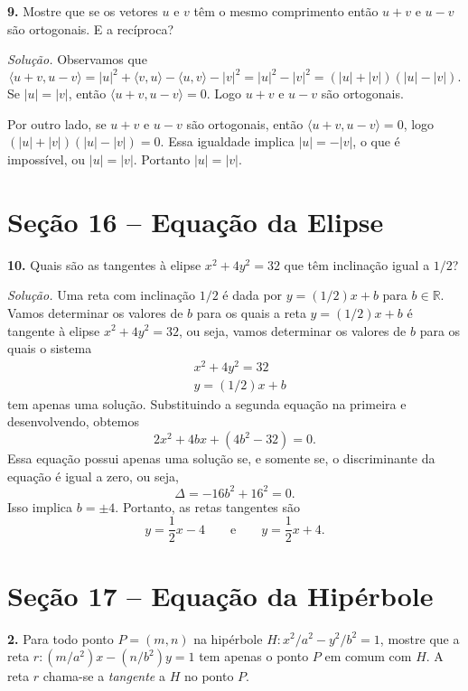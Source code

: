 \documentclass[a4paper,11pt]{article}
\newcommand{\R}{\mathbb{R}}
\begin{document}
\vspace{\baselineskip}

\textbf{9.}
Mostre que se os vetores $u$ e $v$ têm o mesmo comprimento então $u + v$ e $u - v$ são ortogonais.
E a recíproca?

\vspace{\baselineskip}

\emph{Solução.}
Observamos que
\[
  \langle u + v, u - v \rangle = |u|^2 + \langle v, u \rangle - \langle u, v \rangle - |v|^2 = |u|^2 - |v|^2 = (|u| + |v|)(|u| - |v|).
\]
Se $|u| = |v|$, então $\langle u + v, u - v \rangle = 0$.
Logo $u + v$ e $u - v$ são ortogonais.

Por outro lado, se $u + v$ e $u - v$ são ortogonais, então $\langle u + v, u - v \rangle = 0$, logo $(|u|+|v|)(|u|-|v|) = 0$.
Essa igualdade implica $|u| = -|v|$, o que é impossível, ou $|u| = |v|$.
Portanto $|u| = |v|$.

\section*{Seção 16 -- Equação da Elipse}

\textbf{10.}
Quais são as tangentes à elipse $x^2 + 4y^2 = 32$ que têm inclinação igual a $1/2$?

\vspace{\baselineskip}

\emph{Solução.}
Uma reta com inclinação $1/2$ é dada por $y = (1/2)x + b$ para $b \in \R$.
Vamos determinar os valores de $b$ para os quais a reta $y = (1/2)x + b$ é tangente à elipse $x^2 + 4y^2 = 32$, ou seja, vamos determinar os valores de $b$ para os quais o sistema
\begin{align*}
  & x^2 + 4y^2 = 32 \\
  & y = (1/2)x + b
\end{align*}
tem apenas uma solução.
Substituindo a segunda equação na primeira e desenvolvendo, obtemos
\[
  2x^2 + 4bx + (4b^2 - 32) = 0.
\]
Essa equação possui apenas uma solução se, e somente se, o discriminante da equação é igual a zero, ou seja,
\[
  \Delta = -16b^2 + 16^2 = 0.
\]
Isso implica $b = \pm 4$.
Portanto, as retas tangentes são
\[
  y = \frac{1}{2} x - 4 \qquad \text{e} \qquad y = \frac{1}{2} x + 4.
\]

\section*{Seção 17 -- Equação da Hipérbole}

\textbf{2.}
Para todo ponto $P = (m,n)$ na hipérbole $H : x^2/a^2 - y^2/b^2 = 1$, mostre que a reta $r: (m/a^2)x - (n/b^2)y = 1$ tem apenas o ponto $P$ em comum com $H$.
A reta $r$ chama-se a \emph{tangente} a $H$ no ponto $P$.
\end{document}
